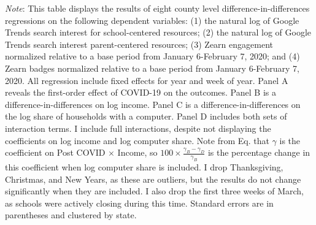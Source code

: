 \begin{table}[hbtp!]
    \caption{Placebo robustness check: share of households with a computer}
    \label{tab:placebo_computer}
  \centering
  \begin{minipage}{\textwidth}
      \footnotesize
      \textit{Note}: This table displays the results of eight county level difference-in-differences regressions on the following dependent variables: (1) the natural log of Google Trends search interest for school-centered resources; (2) the natural log of Google Trends search interest parent-centered resources;  (3) Zearn engagement normalized relative to a base period from January 6-February 7,  2020; and (4) Zearn badges normalized relative to a base period from January 6-February 7,  2020. All regression include fixed effects for year and week of year.
      Panel A reveals the first-order effect of COVID-19 on the outcomes.
      Panel B is a difference-in-differences on log income.
      Panel C is a difference-in-differences on the log share of households with a computer.
      Panel D includes both sets of interaction terms.
      I include full interactions, despite not displaying the coefficients on log income and log computer share.
      Note from Eq.  that $\gamma$ is the coefficient on Post COVID $\times$ Income, so
      $100 \times \frac{\gamma_B-\gamma_D}{\gamma_B}$ is the percentage change in this coefficient
      when log computer share is included.
      I drop Thanksgiving, Christmas, and New Years, as these are outliers, but the results do not change significantly when they are included.
      I also drop the first three weeks of March, as schools were actively closing during this time.
      Standard errors are in parentheses and clustered by state.
  \end{minipage}


\end{table}

